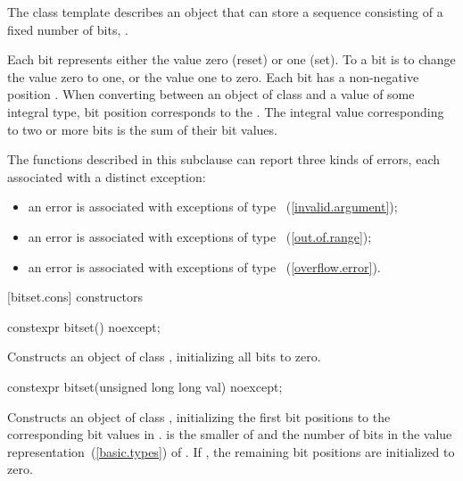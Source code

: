 \pnum
The class template
%
describes an object that can store a sequence consisting of a fixed number of
bits, .

\pnum
Each bit represents either the value zero (reset) or one (set).
To
a bit is to change the value zero to one, or the value one to
zero.
Each bit has a non-negative position .
When converting
between an object of class
and a value of some
integral type, bit position  corresponds to the
.
The integral value corresponding to two
or more bits is the sum of their bit values.

\pnum
The functions described in this subclause can report three kinds of
errors, each associated with a distinct exception:

\begin{itemize}
\item
an
error is associated with exceptions of type
~(\ref{invalid.argument});
%
\item
an
error is associated with exceptions of type
~(\ref{out.of.range});
%
\item
an
error is associated with exceptions of type
~(\ref{overflow.error}).
%
\end{itemize}

[bitset.cons]{ constructors}

%
\begin{itemdecl}
constexpr bitset() noexcept;
\end{itemdecl}

\begin{itemdescr}
\pnum
\effects
Constructs an object of class
,
initializing all bits to zero.
\end{itemdescr}

\begin{itemdecl}
constexpr bitset(unsigned long long val) noexcept;
\end{itemdecl}

\begin{itemdescr}
\pnum
\effects
Constructs an object of class
,
initializing the first  bit positions to the corresponding bit
values in .
 is the smaller of  and the number of bits in the value
representation~(\ref{basic.types}) of .
If , the remaining bit positions are initialized to zero.
\end{itemdescr}

